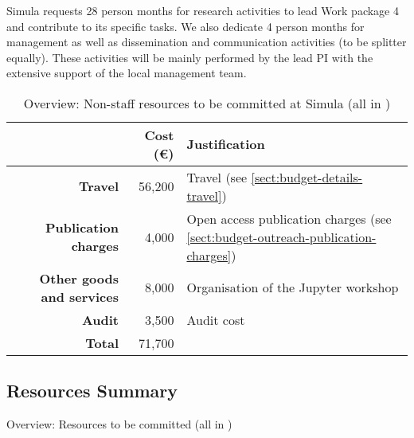 Simula requests 28 person months for research activities to lead Work package 4 and contribute to its specific tasks. 
We also dedicate 4 person months for management  as well as  dissemination and communication activities (to be splitter equally). These activities will be mainly performed by the lead PI with the extensive support of the local management team.  
\bigskip
\begin{table}[H]
\begin{tabular}{|r|r|p{9cm}|}
\hline
\textbf{} & \textbf{Cost (\euro)} & \textbf{Justification} \\\hline
\textbf{Travel} & 56,200 & Travel (see \ref{sect:budget-details-travel})\\\hline
\textbf{Publication charges} & 4,000 & Open access publication charges (see \ref{sect:budget-outreach-publication-charges})\\\hline

\textbf{Other goods and services} & 8,000 & Organisation of the Jupyter workshop  \\\hline   %
\textbf{Audit} & 3,500 & Audit cost \\\hline
\textbf{Total} & 71,700\\\cline{1-2}
\end{tabular}
\caption{Overview: Non-staff resources to be committed at Simula (all in \texteuro)}\vspace*{-1em}
\end{table}

\subsection{Resources Summary}

\begin{table}[ht]\centering
\caption{Overview: Resources to be committed (all in \texteuro)}\label{tab:resources}\vspace*{-1em}
\end{table}

